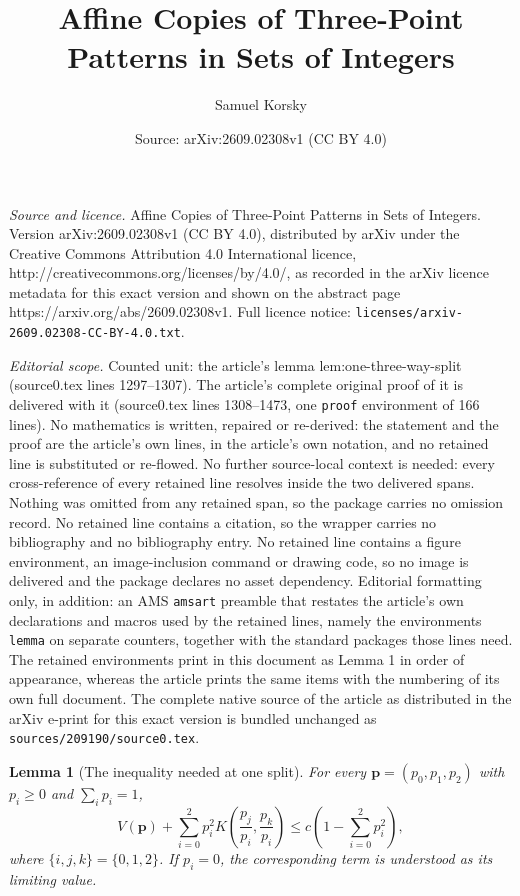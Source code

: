 \documentclass[10pt,a4paper]{amsart}
\title{Affine Copies of Three-Point Patterns in Sets of Integers}
\author{Samuel Korsky}
\date{Source: arXiv:2609.02308v1 (CC BY 4.0)}
\newtheorem{lemma}{Lemma}
\begin{document}
\maketitle

\noindent\emph{Source and licence.} Affine Copies of Three-Point Patterns in Sets of Integers. Version arXiv:2609.02308v1 (CC BY 4.0), distributed by arXiv under the Creative Commons Attribution 4.0 International licence, http://creativecommons.org/licenses/by/4.0/, as recorded in the arXiv licence metadata for this exact version and shown on the abstract page https://arxiv.org/abs/2609.02308v1. Full licence notice: \texttt{licenses/arxiv-2609.02308-CC-BY-4.0.txt}.\par\smallskip

\noindent\textit{Editorial scope.} Counted unit: the article's lemma lem:one-three-way-split (source0.tex lines 1297--1307). The article's complete original proof of it is delivered with it (source0.tex lines 1308--1473, one \texttt{proof} environment of 166 lines). No mathematics is written, repaired or re-derived: the statement and the proof are the article's own lines, in the article's own notation, and no retained line is substituted or re-flowed.  No further source-local context is needed: every cross-reference of every retained line resolves inside the two delivered spans.  Nothing was omitted from any retained span, so the package carries no omission record.  No retained line contains a citation, so the wrapper carries no bibliography and no bibliography entry.  No retained line contains a figure environment, an image-inclusion command or drawing code, so no image is delivered and the package declares no asset dependency.  Editorial formatting only, in addition: an AMS \texttt{amsart} preamble that restates the article's own declarations and macros used by the retained lines, namely the environments \texttt{lemma} on separate counters, together with the standard packages those lines need.  The retained environments print in this document as Lemma 1 in order of appearance, whereas the article prints the same items with the numbering of its own full document.  The complete native source of the article as distributed in the arXiv e-print for this exact version is bundled unchanged as \texttt{sources/209190/source0.tex}.
\begin{lemma}[The inequality needed at one split]
\label{lem:one-three-way-split}
For every $\mathbf p=(p_0,p_1,p_2)$ with $p_i\ge0$ and $\sum_i p_i=1$,
\begin{equation}\label{eq:one-three-way-split}
 V(\mathbf p)+\sum_{i=0}^2p_i^2
 K\left(\frac{p_j}{p_i},\frac{p_k}{p_i}\right)
 \le c\left(1-\sum_{i=0}^2p_i^2\right),
\end{equation}
where $\{i,j,k\}=\{0,1,2\}$.  If $p_i=0$, the corresponding term is
understood as its limiting value.
\end{lemma}
\end{document}
